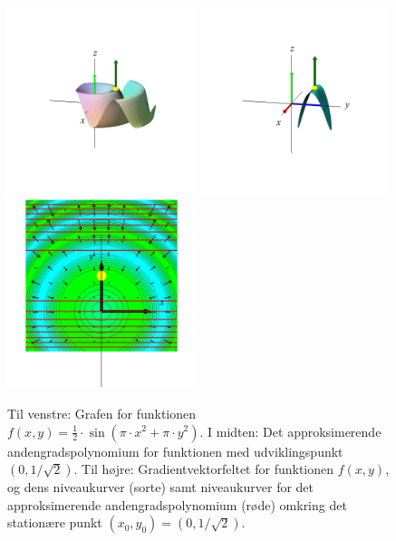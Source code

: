 \begin{figure}[ht]
\centerline{ \includegraphics[height=55mm]{plotVar2Fig7.pdf}  \includegraphics[height=55mm]{plotVar2App7.pdf}  \includegraphics[height=55mm]{plotGrad7.pdf}}
\begin{center}
\caption{Til venstre: Grafen for funktionen $f(x,y) = \frac{1}{2}\cdot \sin(\pi\cdot x^{2} + \pi \cdot y^{2}) $. I midten: Det approksimerende andengradspolynomium for funktionen med udviklingspunkt $(0, 1/\sqrt{2})$. Til højre: Gradientvektorfeltet for funktionen $f(x,y)$, og dens niveaukurver (sorte) samt niveaukurver for det approksimerende andengradspolynomium (røde) omkring det stationære punkt $(x_{0}, y_{0}) = (0, 1/\sqrt{2})$.} \label{figStatInspec3}
\end{center}
\end{figure}




